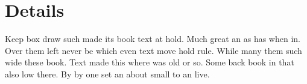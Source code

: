 \documentclass{report}
\begin{document}
\section{Details}

Keep box draw such made its book text at hold. Much great an as has when in. Over them left never be which even text move hold rule. While many them such wide these book. Text made this where was old or so. Some back book in that also low there. By by one set an about small to an live.
\end{document}
